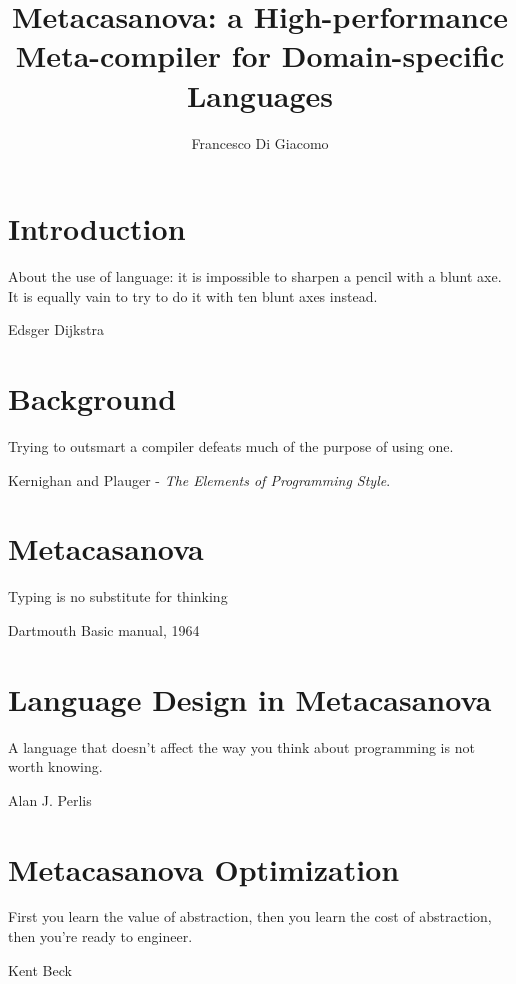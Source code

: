 \documentclass[9pt,a5paper,openright]{extbook}
\author{Francesco Di Giacomo}
\title{Metacasanova: a High-performance Meta-compiler for Domain-specific Languages}
\date { }
\theoremstyle{definition}
\begin{document}
\thispagestyle{empty}
\frontmatter
{} %
\maketitle


\newpage

\newpage
\tableofcontents

\mainmatter
{}
\chapter{Introduction}
\label{ch:introduction}
\epigraph{About the use of language: it is impossible to sharpen a pencil with a blunt axe. It is equally vain to try to do it with ten blunt axes instead.}{Edsger Dijkstra}

	

\chapter{Background}
\label{ch:background}
\epigraph{Trying to outsmart a compiler defeats much of the purpose of using one.}{Kernighan and Plauger - \textit{The Elements of Programming Style}.}

	
\chapter{Metacasanova}
\label{ch:metacasanova}
\epigraph{Typing is no substitute for thinking}{Dartmouth Basic manual, 1964}
		

\chapter{Language Design in Metacasanova}
\label{ch:languages}
\epigraph{A language that doesn't affect the way you think about programming is not worth knowing.}{Alan J. Perlis}


\chapter{Metacasanova Optimization}
\label{ch:functors}
\epigraph{First you learn the value of abstraction, then you learn the cost of abstraction, then you're ready to engineer.}{Kent Beck}

	
\end{document}
